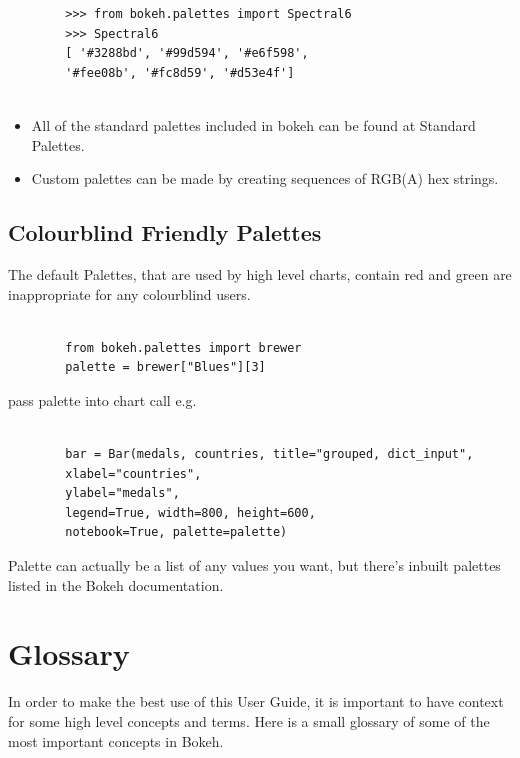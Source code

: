 \documentclass[a4paper,12pt]{article}
\begin{document}
\newpage

{
	\large
	\begin{framed}
		\begin{verbatim}
		>>> from bokeh.palettes import Spectral6
		>>> Spectral6
		[ '#3288bd', '#99d594', '#e6f598', 
		'#fee08b', '#fc8d59', '#d53e4f']
		
		\end{verbatim}
	\end{framed}
}
\begin{itemize}
	\item All of the standard palettes included in bokeh can be found at Standard Palettes.
	\item  Custom palettes can be made by creating sequences of RGB(A) hex strings.
\end{itemize}


\subsection*{Colourblind Friendly Palettes} The default Palettes, that are used by high level charts,  contain red and green are inappropriate for any colourblind users.
{
	\large
	\begin{framed}
		\begin{verbatim}
		
		from bokeh.palettes import brewer
		palette = brewer["Blues"][3]
		\end{verbatim}
	\end{framed}
}
pass palette into chart call e.g.

{
	\large
	\begin{framed}
		\begin{verbatim}
		
		bar = Bar(medals, countries, title="grouped, dict_input", 
		xlabel="countries", 
		ylabel="medals", 
		legend=True, width=800, height=600, 
		notebook=True, palette=palette)
		\end{verbatim}
	\end{framed}
}
\noindent Palette can actually be a list of any values you want, but there's inbuilt palettes listed in the Bokeh documentation. %

\newpage

\section*{Glossary}
In order to make the best use of this User Guide, it is important to have context for some high level concepts and terms. Here is a small glossary of some of the most important concepts in Bokeh.
\end{document}
